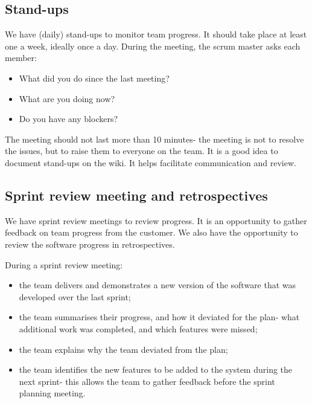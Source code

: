 \documentclass[a4paper, openany]{memoir}
\begin{document}
\subsection{Stand-ups}
We have (daily) stand-ups to monitor team progress. It should take place at least one a week, ideally once a day. During the meeting, the scrum master asks each member:
\begin{itemize}
    \item What did you do since the last meeting?
    \item What are you doing now?
    \item Do you have any blockers?
\end{itemize}
The meeting should not last more than 10 minutes- the meeting is not to resolve the issues, but to raise them to everyone on the team. It is a good idea to document stand-ups on the wiki. It helps facilitate communication and review.

\subsection{Sprint review meeting and retrospectives}
We have sprint review meetings to review progress. It is an opportunity to gather feedback on team progress from the customer. We also have the opportunity to review the software progress in retrospectives.

During a sprint review meeting:
\begin{itemize}
    \item the team delivers and demonstrates a new version of the software that was developed over the last sprint;
    \item the team summarises their progress, and how it deviated for the plan- what additional work was completed, and which features were missed;
    \item the team explains why the team deviated from the plan;
    \item the team identifies the new features to be added to the system during the next sprint- this allows the team to gather feedback before the sprint planning meeting.
\end{itemize}
\end{document}
